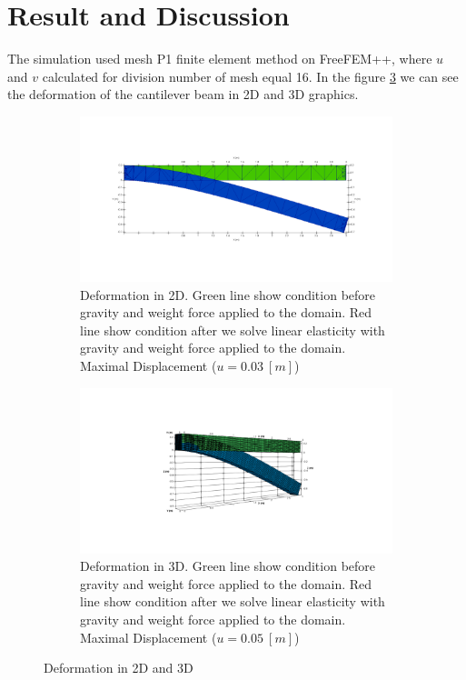 \documentclass[a4paper,11pt]{article}
\begin{document}
\section{Result and Discussion}
The simulation used mesh P1 finite element method on FreeFEM++, where $u$ and $v$ calculated for division number of mesh equal 16. In the figure \ref{fig:displacementresult} we can see the deformation of the cantilever beam in 2D and 3D graphics.
\begin{figure}[h!]
	\begin{subfigure}[b]{0.5\linewidth}
		\centering
		\includegraphics[width=\linewidth]{picture/conference/2d1}
		\caption{Deformation in 2D. Green line show condition before gravity and weight force applied to the domain. Red line show condition after we solve linear elasticity with gravity and weight force applied to the domain. Maximal Displacement ($u = 0.03\ [m]$)}
		\label{fig:2dresult}
	\end{subfigure}
\quad
	\begin{subfigure}[b]{0.5\linewidth}
		\centering
		\includegraphics[width=\linewidth]{picture/conference/3d1}
		\caption{Deformation in 3D. Green line show condition before gravity and weight force applied to the domain. Red line show condition after we solve linear elasticity with gravity and weight force applied to the domain. Maximal Displacement ($u = 0.05\ [m]$)}
		\label{fig:3dresult}
	\end{subfigure}
\caption{Deformation in 2D and 3D}
\label{fig:displacementresult}
\end{figure}
\end{document}
